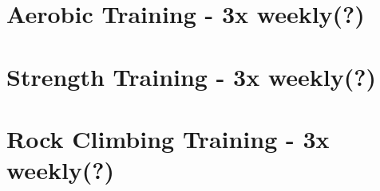 \documentclass[12pt, letterpaper]{article}
\begin{document}
\newpage %


\section{Aerobic Training - 3x weekly(?)}

\newpage %


\section{Strength Training - 3x weekly(?)}

\newpage %


\section{Rock Climbing Training - 3x weekly(?)}

\newpage %

\end{document}
